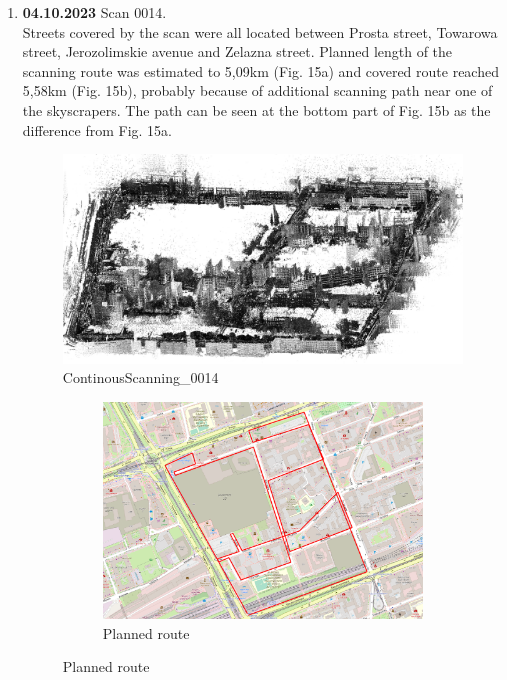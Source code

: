 \documentclass[a4paper,12pt]{book}
\begin{document}
\begin{enumerate}
	\item \textbf{04.10.2023} Scan 0014. \\
	Streets covered by the scan were all located between Prosta street, Towarowa street, Jerozolimskie avenue and Zelazna street. Planned length of the scanning route was estimated to 5,09km (Fig. 15a) and covered route reached 5,58km (Fig. 15b), probably because of additional scanning path near one of the skyscrapers. The path can be seen at the bottom part of Fig. 15b as the difference from Fig. 15a.
	\begin{figure}[H]
		\includegraphics[width=1\linewidth]{cloud14}
		\caption{ContinousScanning\_0014}
	\end{figure}
	\begin{figure}[H]
		\centering
		\begin{subfigure}{.90\textwidth}
			\centering
			\includegraphics[width=1\linewidth]{route_p14}
			\caption{Planned route}
			\label{fig:a14}
		\end{subfigure}%
		\linebreak

\end{figure}
\end{enumerate}
\end{document}

